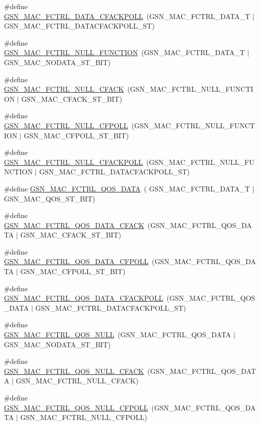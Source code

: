 \begin{DoxyCompactItemize}
\#define \hyperlink{a00523_a1b2e2f110a171d9813e46a07592e218a}{GSN\_\-MAC\_\-FCTRL\_\-DATA\_\-CFACKPOLL}~(GSN\_\-MAC\_\-FCTRL\_\-DATA\_\-T    $|$ GSN\_\-MAC\_\-FCTRL\_\-DATACFACKPOLL\_\-ST)
\item 
\#define \hyperlink{a00523_a15c64655335850ccc8e12213e0062bfd}{GSN\_\-MAC\_\-FCTRL\_\-NULL\_\-FUNCTION}~(GSN\_\-MAC\_\-FCTRL\_\-DATA\_\-T    $|$ GSN\_\-MAC\_\-NODATA\_\-ST\_\-BIT)
\item 
\#define \hyperlink{a00523_ac4ded1d7391249cdae9e7feee7d6415c}{GSN\_\-MAC\_\-FCTRL\_\-NULL\_\-CFACK}~(GSN\_\-MAC\_\-FCTRL\_\-NULL\_\-FUNCTION  $|$ GSN\_\-MAC\_\-CFACK\_\-ST\_\-BIT)
\item 
\#define \hyperlink{a00523_ac716080f065a7f79ff3a228f85e62a50}{GSN\_\-MAC\_\-FCTRL\_\-NULL\_\-CFPOLL}~(GSN\_\-MAC\_\-FCTRL\_\-NULL\_\-FUNCTION  $|$ GSN\_\-MAC\_\-CFPOLL\_\-ST\_\-BIT)
\item 
\#define \hyperlink{a00523_a8e075af8e050ddcaa625f25bab525c05}{GSN\_\-MAC\_\-FCTRL\_\-NULL\_\-CFACKPOLL}~(GSN\_\-MAC\_\-FCTRL\_\-NULL\_\-FUNCTION  $|$ GSN\_\-MAC\_\-FCTRL\_\-DATACFACKPOLL\_\-ST)
\item 
\#define \hyperlink{a00523_a93184f232fda6abb7e3662b769f26972}{GSN\_\-MAC\_\-FCTRL\_\-QOS\_\-DATA}~( GSN\_\-MAC\_\-FCTRL\_\-DATA\_\-T   $|$ GSN\_\-MAC\_\-QOS\_\-ST\_\-BIT)
\item 
\#define \hyperlink{a00523_acc5ff76613fecc27b9043c6b11e5becd}{GSN\_\-MAC\_\-FCTRL\_\-QOS\_\-DATA\_\-CFACK}~(GSN\_\-MAC\_\-FCTRL\_\-QOS\_\-DATA  $|$ GSN\_\-MAC\_\-CFACK\_\-ST\_\-BIT)
\item 
\#define \hyperlink{a00523_a0ff7b5404245e5ca5eced53a6e388bf6}{GSN\_\-MAC\_\-FCTRL\_\-QOS\_\-DATA\_\-CFPOLL}~(GSN\_\-MAC\_\-FCTRL\_\-QOS\_\-DATA  $|$ GSN\_\-MAC\_\-CFPOLL\_\-ST\_\-BIT)
\item 
\#define \hyperlink{a00523_a25b09a77147518ccdeeab10b3abcd4ed}{GSN\_\-MAC\_\-FCTRL\_\-QOS\_\-DATA\_\-CFACKPOLL}~(GSN\_\-MAC\_\-FCTRL\_\-QOS\_\-DATA  $|$ GSN\_\-MAC\_\-FCTRL\_\-DATACFACKPOLL\_\-ST)
\item 
\#define \hyperlink{a00523_aa1c6dd9b0559c27d39f25e20a3855aed}{GSN\_\-MAC\_\-FCTRL\_\-QOS\_\-NULL}~(GSN\_\-MAC\_\-FCTRL\_\-QOS\_\-DATA  $|$ GSN\_\-MAC\_\-NODATA\_\-ST\_\-BIT)
\item 
\#define \hyperlink{a00523_a3288ff0e1bb3bfba47428efa9024c7dd}{GSN\_\-MAC\_\-FCTRL\_\-QOS\_\-NULL\_\-CFACK}~(GSN\_\-MAC\_\-FCTRL\_\-QOS\_\-DATA  $|$ GSN\_\-MAC\_\-FCTRL\_\-NULL\_\-CFACK)
\item 
\#define \hyperlink{a00523_a1cf034f1466459b6b8afdbd7dbb32552}{GSN\_\-MAC\_\-FCTRL\_\-QOS\_\-NULL\_\-CFPOLL}~(GSN\_\-MAC\_\-FCTRL\_\-QOS\_\-DATA  $|$ GSN\_\-MAC\_\-FCTRL\_\-NULL\_\-CFPOLL)

\end{DoxyCompactItemize}

